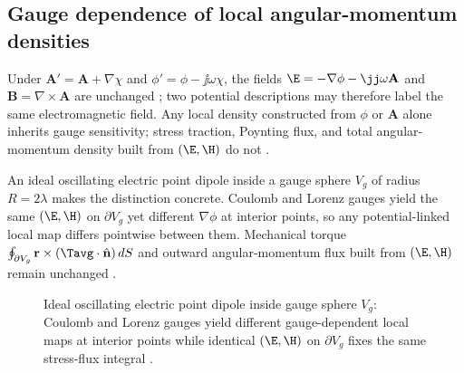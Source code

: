\subsection{Gauge dependence of local angular-momentum densities}
\label{sec:ch01.6.3}

Under \(\mathbf{A}'=\mathbf{A}+\nabla\chi\) and \(\phi'=\phi-\jj\omega\chi\), the fields \(\E=-\nabla\phi-\jj\omega\mathbf{A}\) and \(\mathbf{B}=\nabla\times\mathbf{A}\) are unchanged \cite{maxwell1873}; two potential descriptions may therefore label the same electromagnetic field. Any local density constructed from \(\phi\) or \(\mathbf{A}\) alone inherits gauge sensitivity; stress traction, Poynting flux, and total angular-momentum density built from \((\E,\H)\) do not \cite{belinfante1940,stratton1941}.

An ideal oscillating electric point dipole inside a gauge sphere $V_g$ of radius $R=2\lambda$ makes the distinction concrete. Coulomb and Lorenz gauges yield the same $(\E,\H)$ on $\partial V_g$ yet different $\nabla\phi$ at interior points, so any potential-linked local map differs pointwise between them. Mechanical torque $\oint_{\partial V_g}\mathbf{r}\times(\Tavg\cdot\hat{\mathbf{n}})\,dS$ and outward angular-momentum flux built from $(\E,\H)$ remain unchanged \cite{belinfante1940,stratton1941}.

\begin{figure}[t]
\centering
{}
\caption{Ideal oscillating electric point dipole inside gauge sphere $V_g$: Coulomb and Lorenz gauges yield different gauge-dependent local maps at interior points while identical $(\E,\H)$ on $\partial V_g$ fixes the same stress-flux integral \cite{belinfante1940,stratton1941}.}
\label{fig:ch1.ex63-gauge-volume-sketch}
\end{figure}

